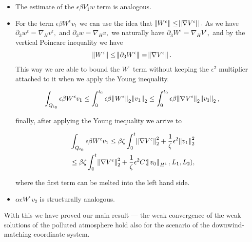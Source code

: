 \documentclass[11pt]{article}
\begin{document}
\begin{enumerate}
\begin{itemize}
      Here $\zeta$ is the constant of the Young inequality, and it only has to be small enough to keep the coefficient of $\norm{\nabla V_\epsilon}$ positive.
      
      \item The estimate of the $\epsilon \beta V^\epsilon_1 w$ term is analogous.
      
      \item For the term $\epsilon \beta W^\epsilon v_1$ we can use the idea that $\norm{W^\epsilon} \leq \norm{\nabla V^\epsilon}.$ As we have $\partial_3 w^\epsilon = \nabla_H v^\epsilon,$ and $\partial_3 w = \nabla_H v,$ we naturally have $\partial_3 W^\epsilon = \nabla_H V^\epsilon,$ and by the vertical Poincare inequality we have $$\norm{W^\epsilon} \leq \norm{\partial_3 W^\epsilon} = \norm{\nabla V^\epsilon}.$$ This way we are able to bound the $W^\epsilon$ term without keeping the $\epsilon^2$ multiplier attached to it when we apply the Young inequality.
      
      $$ \int_{Q_{t_0}} \epsilon \beta W^\epsilon v_1 \leq \int_0^{t_0} \epsilon \beta \norm{W^\epsilon}_2 \norm{v_1}_2 \leq \int_0^{t_0} \epsilon \beta \norm{\nabla V^\epsilon}_2 \norm{v_1}_2, $$
      
      finally, after applying the Young inequality we arrive to
      
      \begin{equation}
        \begin{split}
          & \int_{Q_{t_0}} \epsilon \beta W^\epsilon v_1 \leq \beta \zeta \int_0^t \norm{\nabla V^\epsilon}_2^2 + \frac{1}{\zeta} \epsilon^2 \norm{v_1}_2^2 \\
          & \leq \beta \zeta \int_0^t \norm{\nabla V^\epsilon}_2^2 + \frac{1}{\zeta} \epsilon^2 C(\norm{v_0}_{H^1}, L_1, L_2),
        \end{split}
      \end{equation}
      
      where the first term can be melted into the left hand side.
            
      \item $\alpha \epsilon W^\epsilon v_2$ is structurally analogous.
      
    
    \end{itemize}

\end{enumerate}

With this we have proved our main result --- the weak convergence of the weak solutions of the polluted atmosphere hold also for the scenario of the downwind-matching coordinate system.

\nocite{*}


\end{document}

